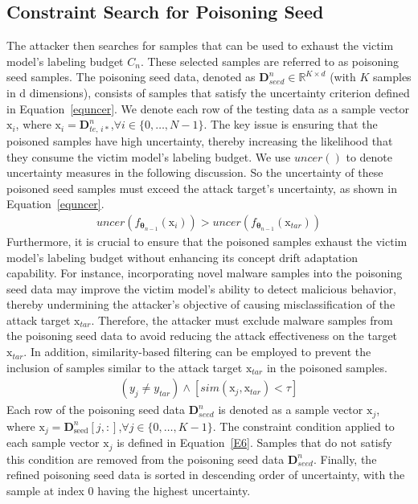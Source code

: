 \subsection{Constraint Search for Poisoning Seed}
The attacker then searches for samples that can be used to exhaust the victim model’s labeling budget $C_{n}$.
These selected samples are referred to as poisoning seed samples.
The poisoning seed data, denoted as $\bm{D}_{seed}^{n} \in \mathbb{R}^{K \times d}$ (with $K$ samples in d dimensions), consists of samples that satisfy the uncertainty criterion defined in Equation~\ref{equncer}.
We denote each row of the testing data as a sample vector $\bm{\mathrm{x}}_{i}$, where $\bm{\mathrm{x}}_{i} = \bm{D}_{te,\,i*}^{n}$,$\forall i \in \{0, \dots, N-1\}$.
The key issue is ensuring that the poisoned samples have high uncertainty, thereby increasing the likelihood that they consume the victim model's labeling budget.
We use $uncer()$ to denote uncertainty measures in the following discussion.
So the uncertainty of these poisoned seed samples must exceed the attack target’s uncertainty, as shown in Equation~\ref{equncer}.
\begin{equation}
	\begin{aligned}
		uncer(f_{\bm{\theta}_{n-1}} \left( \bm{\mathrm{x}}_{i} \right)) > uncer(f_{\bm{\theta}_{n-1}} \left( \bm{\mathrm{x}}_{tar} \right))
	\end{aligned}
	\label{equncer}
\end{equation}
Furthermore, it is crucial to ensure that the poisoned samples exhaust the victim model’s labeling budget without enhancing its concept drift adaptation capability.
For instance, incorporating novel malware samples into the poisoning seed data may improve the victim model’s ability to detect malicious behavior, thereby undermining the attacker’s objective of causing misclassification of the attack target $\bm{\mathrm{x}}_{tar}$.
Therefore, the attacker must exclude malware samples from the poisoning seed data to avoid reducing the attack effectiveness on the target $\bm{\mathrm{x}}_{tar}$.
In addition, similarity-based filtering can be employed to prevent the inclusion of samples similar to the attack target $\bm{\mathrm{x}}_{tar}$ in the poisoned samples.
\begin{equation}
	\begin{aligned}
		(y_{j} \neq y_{tar}) \land [sim(\bm{\mathrm{x}}_{j},\bm{\mathrm{x}}_{tar})< \tau]
	\end{aligned}
	\label{E6}
\end{equation}
Each row of the poisoning seed data $\bm{D}_{seed}^{n}$ is denoted as a sample vector $\bm{\mathrm{x}}_{j}$, where $\bm{\mathrm{x}}_{j} = \bm{D}_{\text{seed}}^{n}[j,:]$,$\forall j \in \{0, \dots, K-1\}$.
The constraint condition applied to each sample vector $\bm{\mathrm{x}}_{j}$ is defined in Equation~\ref{E6}.
Samples that do not satisfy this condition are removed from the poisoning seed data $\bm{D}_{seed}^{n}$.
Finally, the refined poisoning seed data is sorted in descending order of uncertainty, with the sample at index 0 having the highest uncertainty.

